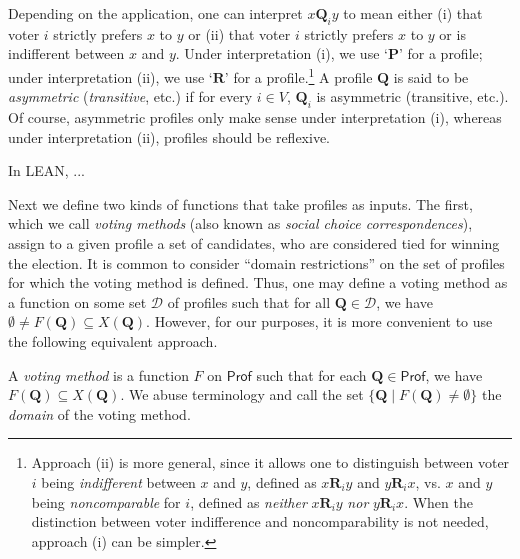 \documentclass[runningheads]{llncs}
\begin{document}

Depending on the application, one can interpret $x\mathbf{Q}_i y$ to mean either (i) that voter $i$ strictly prefers $x$ to $y$ or (ii) that voter $i$ strictly prefers $x$ to $y$ or is indifferent between $x$ and $y$. Under interpretation (i), we use `$\mathbf{P}$' for a profile; under interpretation (ii), we use `$\mathbf{R}$' for a profile.\footnote{\label{VoterNote}Approach (ii) is more general, since it allows one to distinguish between voter $i$ being \textit{indifferent} between $x$ and $y$, defined as $x\mathbf{R}_iy$ and $y\mathbf{R}_ix$, vs. $x$ and $y$ being \textit{noncomparable} for $i$, defined as \textit{neither} $x\mathbf{R}_iy$ \textit{nor} $y\mathbf{R}_ix$. When the distinction between voter indifference and noncomparability is not needed, approach (i) can be simpler.} A profile $\mathbf{Q}$ is said to be \emph{asymmetric} (\emph{transitive}, etc.) if for every $i\in V$, $\mathbf{Q}_i$ is asymmetric (transitive, etc.). Of course, asymmetric profiles only make sense under interpretation (i), whereas under interpretation (ii), profiles should be reflexive.

In LEAN, ...


Next we define two kinds of functions that take profiles as inputs. The first, which we call \textit{voting methods} (also known as \textit{social choice correspondences}), assign to a given profile a set of candidates, who are considered tied for winning the election. It is common to consider ``domain restrictions'' on the set of profiles for which the voting method is defined. Thus, one may define a voting method as a function on some set $\mathcal{D}$ of profiles such that for all $\mathbf{Q}\in\mathcal{D}$, we have ${\emptyset\neq F(\mathbf{Q})\subseteq X(\mathbf{Q})}$. However, for our purposes, it is more convenient to use the following equivalent approach.

\begin{definition} \textnormal{A \emph{voting method} is a function $F$ on $\mathsf{Prof}$ such that for each $\mathbf{Q}\in\mathsf{Prof}$, we have $F(\mathbf{Q})\subseteq X(\mathbf{Q})$. We abuse terminology and call the set $\{\mathbf{Q}\mid F(\mathbf{Q})\neq\emptyset\}$ the \emph{domain} of the voting method.}
\end{definition}
\end{document}
